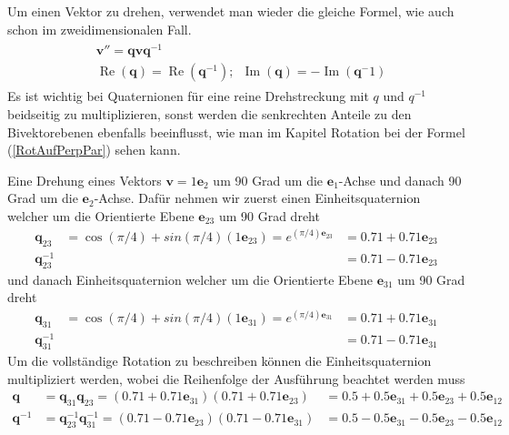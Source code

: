 Um einen Vektor zu drehen, verwendet man wieder die gleiche Formel, wie auch schon im zweidimensionalen Fall.
\begin{align} \label{QuatRotGA}
	\begin{split} 
		&\mathbf{v}'' = \mathbf{qvq}^{-1}\\
		&\operatorname{Re}(\mathbf{q}) = \operatorname{Re}(\mathbf{q}^{-1});\enspace \operatorname{Im}(\mathbf{q}) = -\operatorname{Im}(\mathbf{q}^-1)
	\end{split}
\end{align}
Es ist wichtig bei Quaternionen für eine reine Drehstreckung mit $q$ und $q^{-1}$ beidseitig zu multiplizieren, sonst werden die senkrechten Anteile zu den Bivektorebenen ebenfalls beeinflusst, wie man im Kapitel Rotation bei der Formel (\ref{RotAufPerpPar}) sehen kann.
\begin{beispiel}
	Eine Drehung eines Vektors $\mathbf{v}= 1\mathbf{e}_2$ um 90 Grad um die $\mathbf{e}_1$-Achse und danach 90 Grad um die $\mathbf{e}_2$-Achse. Dafür nehmen wir zuerst einen Einheitsquaternion welcher um die Orientierte Ebene $\mathbf{e}_{23}$ um 90 Grad dreht
	\begin{align}
		\mathbf{q}_{23} &= \cos(\pi/4) + sin(\pi/4)(1\mathbf{e}_{23}) =  e^{(\pi/4)\mathbf{e}_{23}} &= 0.71 + 0.71\mathbf{e}_{23}\\
		\mathbf{q}_{23}^{-1} &&= 0.71 - 0.71\mathbf{e}_{23}
	\end{align}
	und danach Einheitsquaternion welcher um die Orientierte Ebene $\mathbf{e}_{31}$ um 90 Grad dreht
	\begin{align}
		\mathbf{q}_{31} &= \cos(\pi/4) + sin(\pi/4)(1\mathbf{e}_{31}) =  e^{(\pi/4)\mathbf{e}_{31}} &= 0.71 + 0.71\mathbf{e}_{31}\\
		\mathbf{q}_{31}^{-1} &&= 0.71 - 0.71\mathbf{e}_{31}
	\end{align}
	Um die vollständige Rotation zu beschreiben können die  Einheitsquaternion multipliziert werden, wobei die Reihenfolge der Ausführung beachtet werden muss
	\begin{align} \label{FormelBeispielQuaternion}
		\mathbf{q} &= \mathbf{q}_{31}\mathbf{q}_{23} = (0.71 + 0.71\mathbf{e}_{31})(0.71 + 0.71\mathbf{e}_{23}) &= 0.5 + 0.5\mathbf{e}_{31} + 0.5 \mathbf{e}_{23} + 0.5 \mathbf{e}_{12}\\
		\mathbf{q}^{-1} &= \mathbf{q}_{23}^{-1}\mathbf{q}_{31}^{-1} = (0.71 - 0.71\mathbf{e}_{23})(0.71 - 0.71\mathbf{e}_{31}) &= 0.5 - 0.5\mathbf{e}_{31} - 0.5 \mathbf{e}_{23} - 0.5 \mathbf{e}_{12}
	\end{align}

\end{beispiel}
